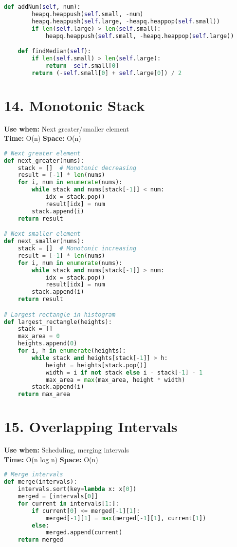 \documentclass[8pt,landscape]{article}
\begin{document}
\begin{multicols}{3}
\begin{lstlisting}[language=Python]
    def addNum(self, num):
        heapq.heappush(self.small, -num)
        heapq.heappush(self.large, -heapq.heappop(self.small))
        if len(self.large) > len(self.small):
            heapq.heappush(self.small, -heapq.heappop(self.large))

    def findMedian(self):
        if len(self.small) > len(self.large):
            return -self.small[0]
        return (-self.small[0] + self.large[0]) / 2
\end{lstlisting}

\section*{14. Monotonic Stack}
\textbf{Use when:} Next greater/smaller element \\
\textbf{Time:} O(n) \quad \textbf{Space:} O(n)
\begin{lstlisting}[language=Python]
# Next greater element
def next_greater(nums):
    stack = []  # Monotonic decreasing
    result = [-1] * len(nums)
    for i, num in enumerate(nums):
        while stack and nums[stack[-1]] < num:
            idx = stack.pop()
            result[idx] = num
        stack.append(i)
    return result

# Next smaller element
def next_smaller(nums):
    stack = []  # Monotonic increasing
    result = [-1] * len(nums)
    for i, num in enumerate(nums):
        while stack and nums[stack[-1]] > num:
            idx = stack.pop()
            result[idx] = num
        stack.append(i)
    return result

# Largest rectangle in histogram
def largest_rectangle(heights):
    stack = []
    max_area = 0
    heights.append(0)
    for i, h in enumerate(heights):
        while stack and heights[stack[-1]] > h:
            height = heights[stack.pop()]
            width = i if not stack else i - stack[-1] - 1
            max_area = max(max_area, height * width)
        stack.append(i)
    return max_area
\end{lstlisting}

\section*{15. Overlapping Intervals}
\textbf{Use when:} Scheduling, merging intervals \\
\textbf{Time:} O(n log n) \quad \textbf{Space:} O(n)
\begin{lstlisting}[language=Python]
# Merge intervals
def merge(intervals):
    intervals.sort(key=lambda x: x[0])
    merged = [intervals[0]]
    for current in intervals[1:]:
        if current[0] <= merged[-1][1]:
            merged[-1][1] = max(merged[-1][1], current[1])
        else:
            merged.append(current)
    return merged


\end{lstlisting}
\end{multicols}
\end{document}
